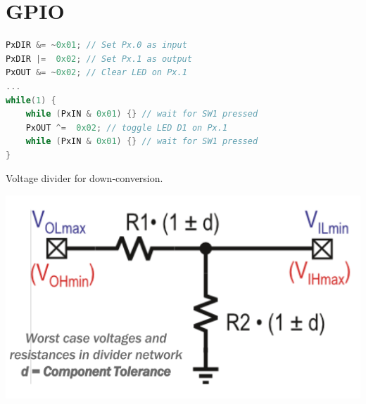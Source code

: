 \section{GPIO }
\begin{lstlisting}[language=c]
PxDIR &= ~0x01;	// Set Px.0 as input
PxDIR |=  0x02;	// Set Px.1 as output
PxOUT &= ~0x02;	// Clear LED on Px.1
...
while(1) {
	while (PxIN & 0x01) {} // wait for SW1 pressed
	PxOUT ^=  0x02; // toggle LED D1 on Px.1
	while (PxIN & 0x01) {} // wait for SW1 pressed
}
\end{lstlisting}\vspace{-25px}

Voltage divider for down-conversion.
\begin{center}
	\includegraphics[width=.6\columnwidth]{"Images/Voltage_Divider.png"}
\end{center}






